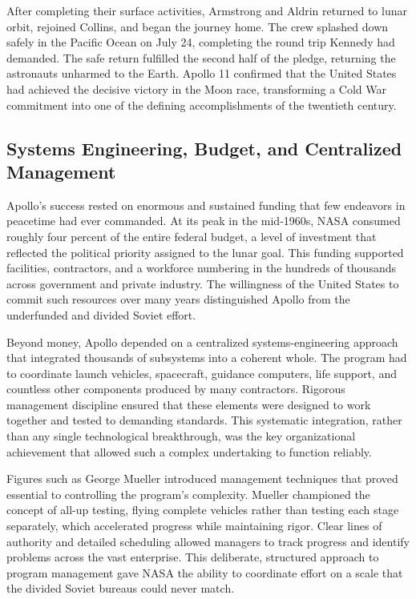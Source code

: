 After completing their surface activities, Armstrong and Aldrin returned to lunar orbit, rejoined Collins, and began the journey home. The crew splashed down safely in the Pacific Ocean on July 24, completing the round trip Kennedy had demanded. The safe return fulfilled the second half of the pledge, returning the astronauts unharmed to the Earth. Apollo 11 confirmed that the United States had achieved the decisive victory in the Moon race, transforming a Cold War commitment into one of the defining accomplishments of the twentieth century. \cite{chaikin1994} \cite{nasaimages}

\subsection{Systems Engineering, Budget, and Centralized Management}
Apollo's success rested on enormous and sustained funding that few endeavors in peacetime had ever commanded. At its peak in the mid-1960s, NASA consumed roughly four percent of the entire federal budget, a level of investment that reflected the political priority assigned to the lunar goal. This funding supported facilities, contractors, and a workforce numbering in the hundreds of thousands across government and private industry. The willingness of the United States to commit such resources over many years distinguished Apollo from the underfunded and divided Soviet effort.

Beyond money, Apollo depended on a centralized systems-engineering approach that integrated thousands of subsystems into a coherent whole. The program had to coordinate launch vehicles, spacecraft, guidance computers, life support, and countless other components produced by many contractors. Rigorous management discipline ensured that these elements were designed to work together and tested to demanding standards. This systematic integration, rather than any single technological breakthrough, was the key organizational achievement that allowed such a complex undertaking to function reliably.

Figures such as George Mueller introduced management techniques that proved essential to controlling the program's complexity. Mueller championed the concept of all-up testing, flying complete vehicles rather than testing each stage separately, which accelerated progress while maintaining rigor. Clear lines of authority and detailed scheduling allowed managers to track progress and identify problems across the vast enterprise. This deliberate, structured approach to program management gave NASA the ability to coordinate effort on a scale that the divided Soviet bureaus could never match.

